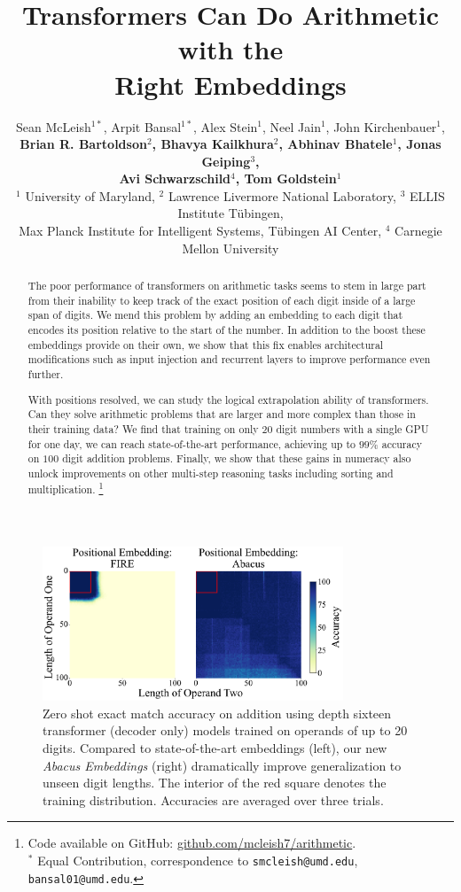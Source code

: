 \documentclass{article}
\title{Transformers Can Do Arithmetic with the\\ Right Embeddings}
\author{
Sean McLeish$^{1*}$, Arpit Bansal$^{1*}$, Alex Stein$^{1}$,  Neel Jain$^{1}$, John Kirchenbauer$^{1}$,\\ 
\textbf{Brian R. Bartoldson$^{2}$, Bhavya Kailkhura$^{2}$, Abhinav Bhatele$^{1}$, Jonas Geiping$^{3}$,}\\ 
\textbf{Avi Schwarzschild$^{4}$, Tom Goldstein$^{1}$} \\
{$^{1}$ University of Maryland, 
$^{2}$ Lawrence Livermore National Laboratory,}
$^{3}$ ELLIS Institute T\"ubingen,\\ Max Planck Institute for Intelligent Systems, T\"ubingen AI Center, 
$^{4}$ Carnegie Mellon University
}
\begin{document}
\maketitle


\begin{abstract}
 The poor performance of transformers on arithmetic tasks seems to stem in large part from their inability to keep track of the exact position of each digit inside of a large span of digits.
We mend this problem by adding an embedding to each digit that encodes its position relative to the start of the number.  
In addition to the boost these embeddings provide on their own, we show that this fix enables architectural modifications such as input injection and recurrent layers to improve performance even further.

With positions resolved, we can study the logical extrapolation ability of transformers.
Can they solve arithmetic problems that are larger and more complex than those in their training data?
We find that training on only $20$ digit numbers with a single GPU for one day, we can reach state-of-the-art performance, achieving up to $99\%$ accuracy on $100$ digit addition problems.
Finally, we show that these gains in numeracy also unlock improvements on other multi-step reasoning tasks including sorting and multiplication. 
\footnote{ Code available on GitHub: \url{github.com/mcleish7/arithmetic}. \\$^*$ Equal Contribution, correspondence to \texttt{smcleish@umd.edu}, \texttt{bansal01@umd.edu}.}

\end{abstract}

\begin{figure}[ht!]
    \centering
    \includegraphics[width=0.8\textwidth]{Figures/grids_plot_one_cover.pdf}
    \caption{
    Zero shot exact match accuracy on addition using depth sixteen transformer (decoder only) models trained on operands of up to 20 digits. Compared to state-of-the-art embeddings (left), our new \textit{Abacus Embeddings} (right) dramatically improve generalization to unseen digit lengths. The interior of the red square denotes the training distribution. Accuracies are averaged over three trials.
    }
    \label{fig:cover_fig}
\end{figure}
\end{document}

